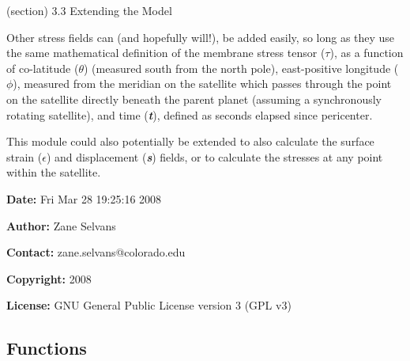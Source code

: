   (section) 3.3 Extending the Model

    Other stress fields can (and hopefully will!), be added easily, so long
    as they use the same mathematical definition of the membrane stress 
    tensor (\(\tau\)), as a function of co-latitude (\(\theta\)) (measured 
    south from the north pole), east-positive longitude (\(\phi\)), 
    measured from the meridian on the satellite which passes through the 
    point on the satellite directly beneath the parent planet (assuming a 
    synchronously rotating satellite), and time (\textbf{\textit{t}}), 
    defined as seconds elapsed since pericenter.

    This module could also potentially be extended to also calculate the 
    surface strain (\(\epsilon\)) and displacement (\textbf{\textit{s}}) 
    fields, or to calculate the stresses at any point within the satellite.

\textbf{Date:} Fri Mar 28 19:25:16 2008



\textbf{Author:} Zane Selvans



\textbf{Contact:} zane.selvans@colorado.edu



\textbf{Copyright:} 2008



\textbf{License:} GNU General Public License version 3 (GPL v3)





  \subsection{Functions}

    \label{SatStress:SatStress:nvf2dict}

    \vspace{0.5ex}

